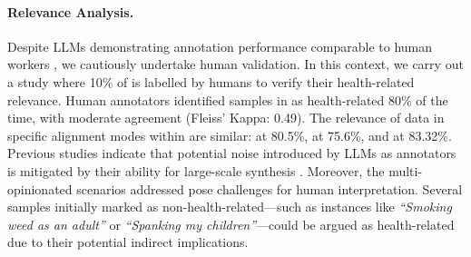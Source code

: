 \paragraph{Relevance Analysis.}
Despite LLMs demonstrating annotation performance comparable to human workers \citep{gilardi2023chatgpt}, we cautiously undertake human validation. In this context, we carry out a study where 10\% of \ourdataset is labelled by humans to verify their health-related relevance. Human annotators identified samples in \ourdataset as health-related 80\% of the time, with moderate agreement (Fleiss' Kappa: 0.49). The relevance of data in specific alignment modes within \ourdataset are similar: \overton at 80.5\%, \steerable at 75.6\%, and \distributional at 83.32\%. Previous studies indicate that potential noise introduced by LLMs as annotators is mitigated by their ability for large-scale synthesis \citep{west2022symbolic}. Moreover, the multi-opinionated scenarios addressed pose challenges for human interpretation. Several samples initially marked as non-health-related—such as instances like \textit{``Smoking weed as an adult''} or \textit{``Spanking my children''}—could be argued as health-related due to their potential indirect implications.


    




